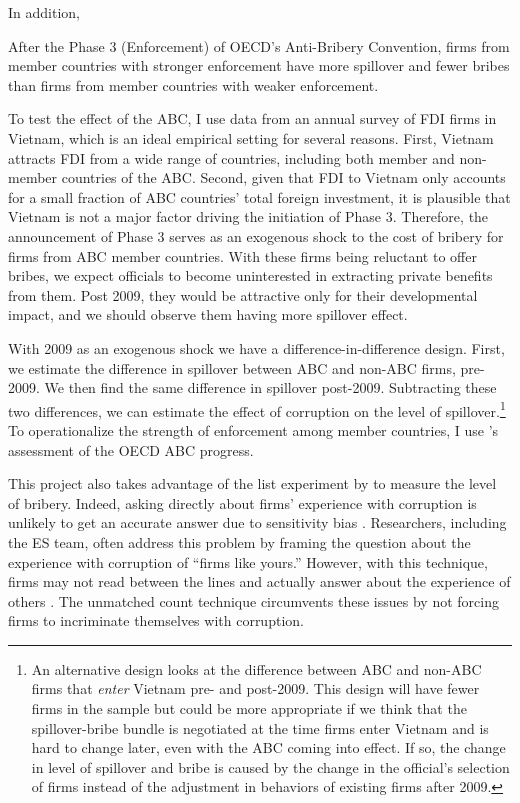 In addition,

\begin{hyp}
After the Phase 3 (Enforcement) of OECD's Anti-Bribery Convention, firms from member countries with stronger enforcement have more spillover and fewer bribes than firms from member countries with weaker enforcement.
\end{hyp}

To test the effect of the ABC, I use data from an annual survey of FDI firms in Vietnam, which is an ideal empirical setting for several reasons. First, Vietnam attracts FDI from a wide range of countries, including both member and non-member countries of the ABC. Second, given that FDI to Vietnam only accounts for a small fraction of ABC countries' total foreign investment, it is plausible that Vietnam is not a major factor driving the initiation of Phase 3. Therefore, the announcement of Phase 3 serves as an exogenous shock to the cost of bribery for firms from ABC member countries. With these firms being reluctant to offer bribes, we expect officials to become uninterested in extracting private benefits from them. Post 2009, they would be attractive only for their developmental impact, and we should observe them having more spillover effect.

With 2009 as an exogenous shock we have a difference-in-difference design. First, we estimate the difference in spillover between ABC and non-ABC firms, pre-2009. We then find the same difference in spillover post-2009. Subtracting these two differences, we can estimate the effect of corruption on the level of spillover.\footnote{An alternative design looks at the difference between ABC and non-ABC firms that \textit{enter} Vietnam pre- and post-2009. This design will have fewer firms in the sample but could be more appropriate if we think that the spillover-bribe bundle is negotiated at the time firms enter Vietnam and is hard to change later, even with the ABC coming into effect. If so, the change in level of spillover and bribe is caused by the change in the official's selection of firms instead of the adjustment in behaviors of existing firms after 2009.} To operationalize the strength of enforcement among member countries, I use \citet{Heimann2013}'s assessment of the OECD ABC progress.


This project also takes advantage of the list experiment by \citet{Malesky2015} to measure the level of bribery. Indeed, asking directly about firms' experience with corruption is unlikely to get an accurate answer due to sensitivity bias \citep{Coutts2011}. Researchers, including the ES team, often address this problem by framing the question about the experience with corruption of ``firms like yours.'' However, with this technique, firms may not read between the lines and actually answer about the experience of others \citep{Ahart2004}. The unmatched count technique circumvents these issues by not forcing firms to incriminate themselves with corruption.